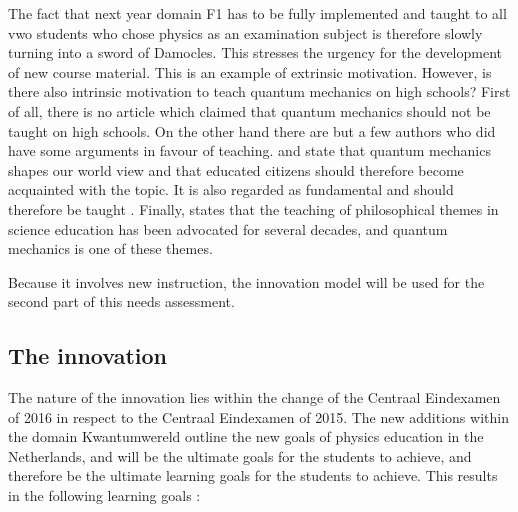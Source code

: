 \documentclass[11pt,twoside]{report} %
\begin{document}
The fact that next year domain F1 has to be fully implemented and taught to all vwo students who chose physics as an examination subject is therefore slowly turning into a sword of Damocles. This stresses the urgency for the development of new course material. This is an example of extrinsic motivation. However, is there also intrinsic motivation to teach quantum mechanics on high schools? First of all, there is no article which claimed that quantum mechanics should not be taught on high schools. On the other hand there are but a few authors who did have some arguments in favour of teaching.  and  state that quantum mechanics shapes our world view and that educated citizens should therefore become acquainted with the topic. It is also regarded as fundamental and should therefore be taught \cite{henriksen,hobson}. Finally,  states that the teaching of philosophical themes in science education has been advocated for several decades, and quantum mechanics is one of these themes.

Because it involves new instruction, the innovation model will be used for the second part of this needs assessment.

\subsection{The innovation}
\label{subsec:needsassessmentinnovation}

The nature of the innovation lies within the change of the Centraal Eindexamen of 2016 in respect to the Centraal Eindexamen of 2015. The new additions within the domain Kwantumwereld outline the new goals of physics education in the Netherlands, and will be the ultimate goals for the students to achieve, and therefore be the ultimate learning goals for the students to achieve. This results in the following learning goals \cite{eindexamen2016}:
\end{document}
